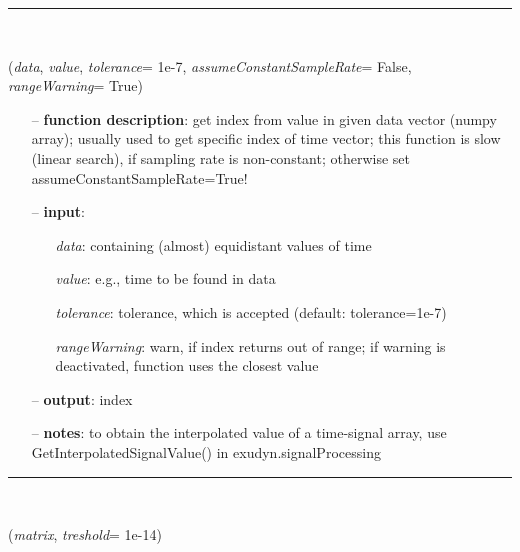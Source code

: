 \begin{itemize}[leftmargin=1.4cm]
%
\noindent\rule{8cm}{0.75pt}\vspace{1pt} \\ 
\begin{flushleft}
\label{sec:advancedUtilities:IndexFromValue}
({\it data}, {\it value}, {\it tolerance}= 1e-7, {\it assumeConstantSampleRate}= False, {\it rangeWarning}= True)
\end{flushleft}
\setlength{\itemindent}{0.7cm}
\begin{itemize}[leftmargin=0.7cm]
\item[--]
{\bf function description}: get index from value in given data vector (numpy array); usually used to get specific index of time vector; this function is slow (linear search), if sampling rate is non-constant; otherwise set assumeConstantSampleRate=True!
\item[--]
{\bf input}: \vspace{-6pt}
\begin{itemize}[leftmargin=1.2cm]
\setlength{\itemindent}{-0.7cm}
\item[]{\it data}: containing (almost) equidistant values of time
\item[]{\it value}: e.g., time to be found in data
\item[]{\it tolerance}: tolerance, which is accepted (default: tolerance=1e-7)
\item[]{\it rangeWarning}: warn, if index returns out of range; if warning is deactivated, function uses the closest value
\end{itemize}
\item[--]
{\bf output}: index
\item[--]
{\bf notes}: to obtain the interpolated value of a time-signal array, use GetInterpolatedSignalValue() in exudyn.signalProcessing
\vspace{12pt}\end{itemize}
%
\noindent\rule{8cm}{0.75pt}\vspace{1pt} \\ 
\begin{flushleft}
\label{sec:advancedUtilities:RoundMatrix}
({\it matrix}, {\it treshold}= 1e-14)
\end{flushleft}
\setlength{\itemindent}{0.7cm}
\begin{itemize}[leftmargin=0.7cm]

\end{itemize}
\end{itemize}
